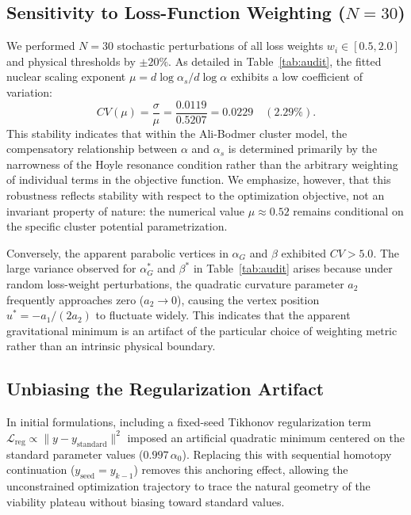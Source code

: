 \documentclass[aps,prd,twocolumn,superscriptaddress,nofootinbib,floatfix]{revtex4-2}
\begin{document}
\subsection{Sensitivity to Loss-Function Weighting ($N=30$)}

We performed $N=30$ stochastic perturbations of all loss weights $w_i \in [0.5, 2.0]$ and physical thresholds by $\pm 20\%$. As detailed in Table~\ref{tab:audit}, the fitted nuclear scaling exponent $\mu = d\log\alpha_s / d\log\alpha$ exhibits a low coefficient of variation:
\begin{equation}
    CV(\mu) = \frac{\sigma}{\mu} = \frac{0.0119}{0.5207} = 0.0229 \quad (2.29\%).
\end{equation}
This stability indicates that within the Ali-Bodmer cluster model, the compensatory relationship between $\alpha$ and $\alpha_s$ is determined primarily by the narrowness of the Hoyle resonance condition rather than the arbitrary weighting of individual terms in the objective function. We emphasize, however, that this robustness reflects stability with respect to the optimization objective, not an invariant property of nature: the numerical value $\mu \approx 0.52$ remains conditional on the specific cluster potential parametrization.

Conversely, the apparent parabolic vertices in $\alpha_G$ and $\beta$ exhibited $CV > 5.0$. The large variance observed for $\alpha_G^*$ and $\beta^*$ in Table~\ref{tab:audit} arises because under random loss-weight perturbations, the quadratic curvature parameter $a_2$ frequently approaches zero ($a_2 \to 0$), causing the vertex position $u^* = -a_1 / (2 a_2)$ to fluctuate widely. This indicates that the apparent gravitational minimum is an artifact of the particular choice of weighting metric rather than an intrinsic physical boundary.

\subsection{Unbiasing the Regularization Artifact}

In initial formulations, including a fixed-seed Tikhonov regularization term $\mathcal{L}_{\text{reg}} \propto \|y - y_{\text{standard}}\|^2$ imposed an artificial quadratic minimum centered on the standard parameter values ($0.997\,\alpha_0$). Replacing this with sequential homotopy continuation ($y_{\text{seed}} = y_{k-1}$) removes this anchoring effect, allowing the unconstrained optimization trajectory to trace the natural geometry of the viability plateau without biasing toward standard values.
\end{document}
